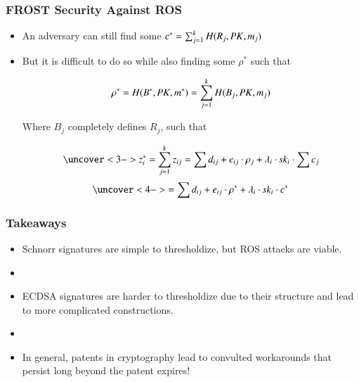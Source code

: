\documentclass[hyperref={pdfpagelabels=true},table,dvipsnames,14pt,aspectratio=169]{beamer}
\begin{document}
\begin{frame}
  \frametitle{FROST Security Against ROS}

  \begin{itemize}
    \item<1-> An adversary can still find some $c^* = \sum_{j=1}^{k} H(R_j, \mathit{PK}, m_j)  $

    \item<2-> But it is difficult to do so while also finding some $\rho^*$ such that

	    \[ \rho^*= H(B^*, \mathit{PK}, m^*)  = \sum_{j=1}^k H(B_j, \mathit{PK}, m_j) \]

	Where $B_j$ completely defines $R_j$, such that
	
		  \[ \uncover<3-> {z_i^* = \sum_{j=1}^k z_{ij} = \sum d_{ij} + e_{ij} \cdot \rho_j  + \lambda_i \cdot \sk_i \cdot \sum c_j} \] 
		  \[ \uncover<4-> { = \sum d_{ij} + e_{ij} \cdot \rho^* + \lambda_i \cdot \sk_i \cdot c^*} \]
  \end{itemize}
\end{frame}





\begin{frame}
  \frametitle{Takeaways}

  \begin{itemize}
    \item Schnorr signatures are simple to thresholdize, but ROS attacks are viable.  
    \item[]
    \item<2-> ECDSA signatures are harder to thresholdize due to their structure and lead to more complicated constructions. 
    \item[]
    \item<3-> In general, patents in cryptography lead to convulted workarounds that persist long beyond the patent expires!
  \end{itemize}
\end{frame}
\end{document}
